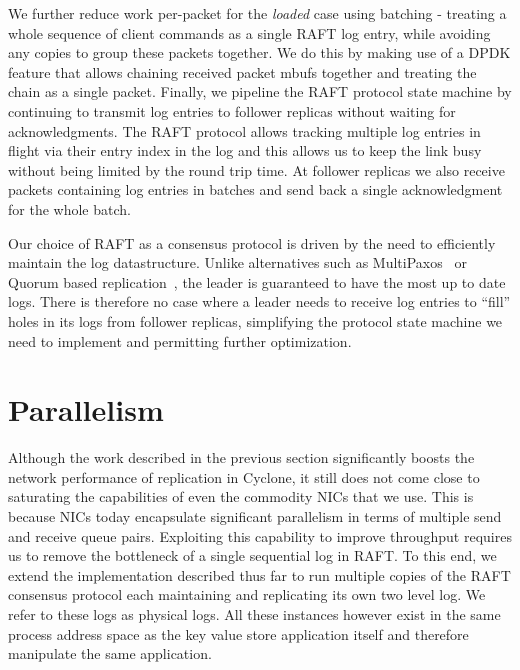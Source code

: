 \documentclass[letterpaper,twocolumn,10pt]{article}
\begin{document}
We further reduce work per-packet for the \emph{loaded} case using
batching - treating a whole sequence of client commands as a single
RAFT log entry, while avoiding any copies to group these packets
together. We do this by making use of a DPDK feature that allows
chaining received packet mbufs together and treating the chain as a
single packet.  Finally, we pipeline the RAFT protocol state machine by
continuing to transmit log entries to follower replicas without waiting
for acknowledgments. The RAFT protocol allows tracking multiple log
entries in flight via their entry index in the log and this allows us
to keep the link busy without being limited by the round trip time.
At follower replicas we also receive packets containing log entries in
batches and send back a single acknowledgment for the whole batch.

Our choice of RAFT as a consensus protocol is driven by the need to
efficiently maintain the log datastructure. Unlike alternatives such
as MultiPaxos~\cite{multipaxos} or Quorum based
replication~\cite{quorum}, the leader is guaranteed to have the most
up to date logs. There is therefore no case where a leader needs to
receive log entries to ``fill'' holes in its logs from follower
replicas, simplifying the protocol state machine we need to implement
and permitting further optimization.

\section{Parallelism}
\label{sec:parallelism}


Although the work described in the previous section significantly
boosts the network performance of replication in Cyclone, it still
does not come close to saturating the capabilities of even the
commodity NICs that we use. This is because NICs today encapsulate
significant parallelism in terms of multiple send and receive queue
pairs. Exploiting this capability to improve throughput requires us to
remove the bottleneck of a single sequential log in RAFT. To this end,
we extend the implementation described thus far to run multiple copies
of the RAFT consensus protocol each maintaining and replicating its
own two level log. We refer to these logs as physical logs. All these
instances however exist in the same process address space as the key
value store application itself and therefore manipulate the same
application.
\end{document}
